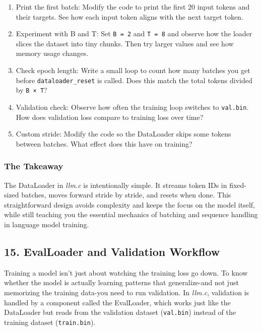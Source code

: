 \documentclass[
  letterpaper,
  DIV=11,
  numbers=noendperiod]{scrreprt}
\providecommand{\tightlist}{%
  \setlength{\itemsep}{0pt}\setlength{\parskip}{0pt}}
\begin{document}
\begin{enumerate}
\def\labelenumi{\arabic{enumi}.}
\tightlist
\item
  Print the first batch: Modify the code to print the first 20 input
  tokens and their targets. See how each input token aligns with the
  next target token.
\item
  Experiment with B and T: Set \texttt{B\ =\ 2} and \texttt{T\ =\ 8} and
  observe how the loader slices the dataset into tiny chunks. Then try
  larger values and see how memory usage changes.
\item
  Check epoch length: Write a small loop to count how many batches you
  get before \texttt{dataloader\_reset} is called. Does this match the
  total tokens divided by \texttt{B\ ×\ T}?
\item
  Validation check: Observe how often the training loop switches to
  \texttt{val.bin}. How does validation loss compare to training loss
  over time?
\item
  Custom stride: Modify the code so the DataLoader skips some tokens
  between batches. What effect does this have on training?
\end{enumerate}

\subsubsection{The Takeaway}\label{the-takeaway-3}

The DataLoader in \emph{llm.c} is intentionally simple. It streams token
IDs in fixed-sized batches, moves forward stride by stride, and resets
when done. This straightforward design avoids complexity and keeps the
focus on the model itself, while still teaching you the essential
mechanics of batching and sequence handling in language model training.

\subsection{15. EvalLoader and Validation
Workflow}\label{evalloader-and-validation-workflow}

Training a model isn't just about watching the training loss go down. To
know whether the model is actually learning patterns that generalize-and
not just memorizing the training data-you need to run validation. In
\emph{llm.c}, validation is handled by a component called the
EvalLoader, which works just like the DataLoader but reads from the
validation dataset (\texttt{val.bin}) instead of the training dataset
(\texttt{train.bin}).
\end{document}
